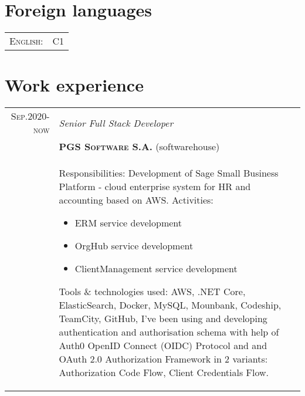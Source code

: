 \documentclass[a4paper,12pt]{article}
\begin{document}
\vspace{2em}

\section{Foreign languages}
\begin{tabular}{r|p{11cm}}
	\textsc{English:}&C1\\
\end{tabular}

\vspace{2em}


\section{Work experience}
\begin{tabular}{r|p{12cm}}
\textsc{Sep.2020-now}
	&\emph{Senior Full Stack Developer}\\
	&\textsc{\textbf{PGS Software S.A.}}  (softwarehouse)\\ 
	&\footnotesize{
		Responsibilities: Development of Sage Small Business Platform - cloud enterprise system for HR and accounting based on AWS.\newline
		Activities:
		\begin{itemize}
			\item ERM service development
			\item OrgHub service development
			\item ClientManagement service development
		\end{itemize}
		Tools \& technologies used: \newline
		AWS, .NET Core, ElasticSearch, Docker, MySQL, Mounbank, Codeship, TeamCity, GitHub,
		I've been using and developing authentication and authorisation schema with help of 
		Auth0 OpenID Connect (OIDC) Protocol and and OAuth 2.0 Authorization Framework in 2 variants: Authorization Code Flow, Client Credentials Flow.
	}
	\multicolumn{2}{c}{}
\end{tabular}
\end{document}
